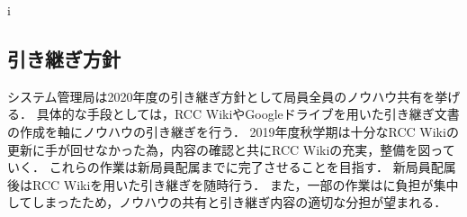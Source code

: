 i\subsection*{引き継ぎ方針}

システム管理局は2020年度の引き継ぎ方針として局員全員のノウハウ共有を挙げる．
具体的な手段としては，RCC WikiやGoogleドライブを用いた引き継ぎ文書の作成を軸にノウハウの引き継ぎを行う．
2019年度秋学期は十分なRCC Wikiの更新に手が回せなかった為，内容の確認と共にRCC Wikiの充実，整備を図っていく．
これらの作業は新局員配属までに完了させることを目指す．
新局員配属後はRCC Wikiを用いた引き継ぎを随時行う．
また，一部の作業は\thirdGrade{}に負担が集中してしまったため，ノウハウの共有と引き継ぎ内容の適切な分担が望まれる．
